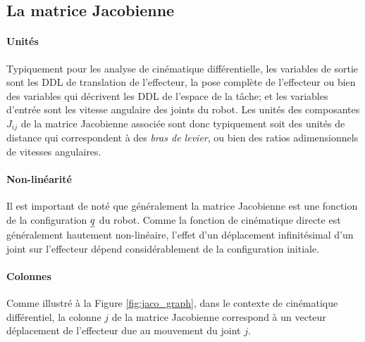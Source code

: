 \subsection{La matrice Jacobienne}

\paragraph{Unités} Typiquement pour les analyse de cinématique différentielle, les variables de sortie sont les DDL de translation de l'effecteur, la pose complète de l'effecteur ou bien des variables qui décrivent les DDL de l'espace de la tâche; et les variables d'entrée sont les vitesse angulaire des joints du robot. Les unités des composantes $J_{ij}$ de la matrice Jacobienne associée sont donc typiquement soit des unités de distance qui correspondent à des \textit{bras de levier}, ou bien des ratios adimensionnels de vitesses angulaires. 

\paragraph{Non-linéarité} Il est important de noté que généralement la matrice Jacobienne est une fonction de la configuration $\underline{q}$ du robot. Comme la fonction de cinématique directe est généralement hautement non-linéaire, l'effet d'un déplacement infinitésimal d'un joint sur l'effecteur dépend considérablement de la configuration initiale. 

\paragraph{Colonnes} Comme illustré à la Figure \ref{fig:jaco_graph}, dans le contexte de cinématique différentiel, la colonne $j$ de la matrice Jacobienne correspond à un vecteur déplacement de l'effecteur due au mouvement du joint $j$. 




